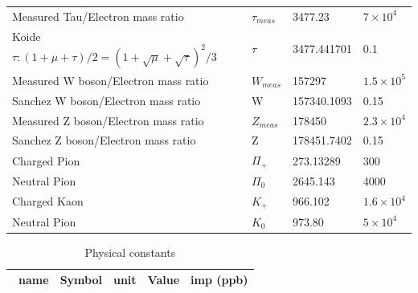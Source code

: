 \documentclass[a4paper,9pt]{article}
\begin{document}
\begin{appendix}
\begin{table}
\begin{tabular}{llll}
     Measured Tau/Electron mass ratio  & $\tau_{meas}$ & 3477.23  & $7\times 10^4$ \\
     
     Koide $\tau : (1+\mu+\tau)/2 = (1+\sqrt\mu+\sqrt\tau)^2/3$ & $\tau$ & 3477.441701  & 0.1 \\
     
     Measured W boson/Electron mass ratio  & $W_{meas}$ & 157297  & $1.5 \times 10^5$ \\
     
    Sanchez W boson/Electron mass ratio  & W & 157340.1093  & 0.15 \\
     
    Measured Z boson/Electron mass ratio  & $Z_{meas}$ & 178450  & $2.3 \times 10^4$ \\
     
     Sanchez Z boson/Electron mass ratio  & Z & 178451.7402  & 0.15 \\
     
     Charged Pion & $\Pi_+$ & 273.13289  & 300 \\
     
     Neutral Pion & $\Pi_0$ & 2645.143 & 4000 \\
     
     Charged Kaon & $K_+$ & 966.102  & $1.6 \times 10^4$ \\
     
     Neutral Pion & $ K_0 $ & 973.80  & $ 5 \times 10^4$ \\
     
         
   \bottomrule
  \end{tabular}
\end{table}


\begin{table}
\caption{Physical constants}
\label{tab:2:table2}
  \hskip-2.0cm\begin{tabular}{lllll}
    \toprule
    \cmidrule(r){1-5}
    \ name & Symbol  & unit  & Value & imp (ppb) \\
    \midrule
  

\end{tabular}
\end{table}
\end{appendix}
\end{document}
